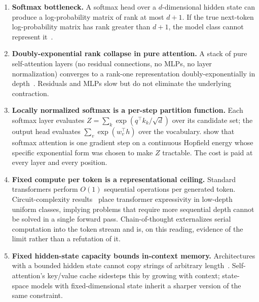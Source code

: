 \begin{enumerate}[label=(A\arabic*),leftmargin=2.5em]
  \item \label{cl:softmax_bottleneck}
        \textbf{Softmax bottleneck.}
        A softmax head over a $d$-dimensional hidden state can produce a log-probability matrix of rank at most $d+1$.
        If the true next-token log-probability matrix has rank greater than $d+1$, the model class cannot represent it~\citep{yang2018softmax}.

  \item \label{cl:rank_collapse}
        \textbf{Doubly-exponential rank collapse in pure attention.}
        A stack of pure self-attention layers (no residual connections, no MLPs, no layer normalization) converges to a rank-one representation doubly-exponentially in depth~\citep{dong2021attention}.
        Residuals and MLPs slow but do not eliminate the underlying contraction.

  \item \label{cl:partition_local}
        \textbf{Locally normalized softmax is a per-step partition function.}
        Each softmax layer evaluates $Z = \sum_k \exp(q^\top k_k / \sqrt{d})$ over its candidate set;
        the output head evaluates $\sum_v \exp(w_v^\top h)$ over the vocabulary.
        \citet{ramsauer2020hopfield} show that softmax attention is one gradient step on a continuous Hopfield energy whose specific exponential form was chosen to make $Z$ tractable.
        The cost is paid at every layer and every position.

  \item \label{cl:fixed_compute}
        \textbf{Fixed compute per token is a representational ceiling.}
        Standard transformers perform $O(1)$ sequential operations per generated token.
        Circuit-complexity results~\citep{merrill2023parallelism,strobl2024transformer} place transformer expressivity in low-depth uniform classes, implying problems that require more sequential depth cannot be solved in a single forward pass.
        Chain-of-thought externalizes serial computation into the token stream and is, on this reading, evidence of the limit rather than a refutation of it.

  \item \label{cl:hidden_state}
        \textbf{Fixed hidden-state capacity bounds in-context memory.}
        Architectures with a bounded hidden state cannot copy strings of arbitrary length~\citep{jelassi2024repeat,arora2024simple}.
        Self-attention's key/value cache sidesteps this by growing with context;
        state-space models with fixed-dimensional state inherit a sharper version of the same constraint.
\end{enumerate}

